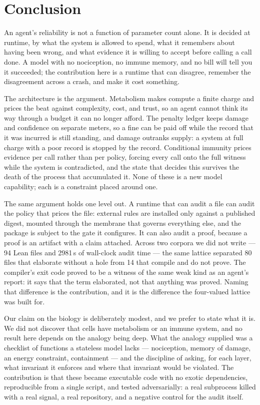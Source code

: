 \documentclass[conference]{IEEEtran}
\begin{document}
\section{Conclusion}
\label{sec:conclusion}

An agent's reliability is not a function of parameter count alone. It is decided
at runtime, by what the system is allowed to spend, what it remembers about having
been wrong, and what evidence it is willing to accept before calling a call done.
A model with no nociception, no immune memory, and no bill will tell you it
succeeded; the contribution here is a runtime that can disagree, remember the
disagreement across a crash, and make it cost something.

The architecture is the argument. Metabolism makes compute a finite charge and
prices the beat against complexity, cost, and trust, so an agent cannot think its
way through a budget it can no longer afford. The penalty ledger keeps damage and
confidence on separate meters, so a fine can be paid off while the record that it
was incurred is still standing, and damage outranks supply: a system at full
charge with a poor record is stopped by the record. Conditional immunity prices
evidence per call rather than per policy, forcing every call onto the full witness
while the system is contradicted, and the state that decides this survives the
death of the process that accumulated it. None of these is a new model
capability; each is a constraint placed around one.

The same argument holds one level out. A runtime that can audit a file can audit
the policy that prices the file: external rules are installed only against a
published digest, mounted through the membrane that governs everything else, and
the package is subject to the gate it configures. It can also audit a proof,
because a proof is an artifact with a claim attached. Across two corpora we did
not write --- 94 Lean files and 2981\,s of wall-clock audit time --- the same
lattice separated 80 files that elaborate without a hole from 14 that compile and
do not prove. The compiler's exit code proved to be a witness of the same weak kind as
an agent's report: it says that the term elaborated, not that anything was
proved. Naming that difference is the contribution, and it is the difference the
four-valued lattice was built for.

Our claim on the biology is deliberately modest, and we prefer to state what it
is. We did not discover that cells have metabolism or an immune system, and no
result here depends on the analogy being deep. What the analogy supplied was a
checklist of functions a stateless model lacks --- nociception, memory of damage,
an energy constraint, containment --- and the discipline of asking, for each
layer, what invariant it enforces and where that invariant would be violated. The
contribution is that these became executable code with no exotic dependencies,
reproducible from a single script, and tested adversarially: a real subprocess
killed with a real signal, a real repository, and a negative control for the
audit itself.
\end{document}
